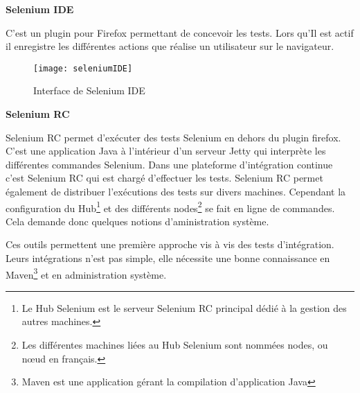 \textbf{Selenium IDE}

		C'est un plugin pour Firefox permettant de concevoir les tests. Lors qu'Il est actif il enregistre
		les différentes actions que réalise un utilisateur sur le navigateur.
		\begin{figure}[!h]
     		\begin{center}
			      \texttt{[image: seleniumIDE]}
			      \caption{Interface de Selenium IDE}
			      \label{seleniumIDE}
		    \end{center}
		\end{figure}		
		

\newpage
\textbf{Selenium RC}

		Selenium RC permet d'exécuter des tests Selenium en dehors du plugin firefox. C'est une
		application Java à l'intérieur d'un serveur Jetty qui interprète les différentes commandes Selenium.
		Dans une plateforme d'intégration continue c'est Selenium RC qui est chargé d'effectuer les tests.
		Selenium RC permet également de distribuer l'exécutions des tests sur divers machines. Cependant
		la configuration du Hub\footnote{Le Hub Selenium est le serveur Selenium RC principal dédié à la gestion
		des autres machines.} et des différents nodes\footnote{Les différentes machines liées au Hub Selenium sont
		nommées nodes, ou nœud en français.} se fait en ligne de commandes. Cela demande donc quelques notions
		d'aministration système.
 		


Ces outils permettent une première approche vis à vis des tests d'intégration. Leurs intégrations n'est pas simple, elle nécessite une bonne connaissance en Maven\footnote{Maven est une application gérant la compilation d'application Java} et
en administration système. 

